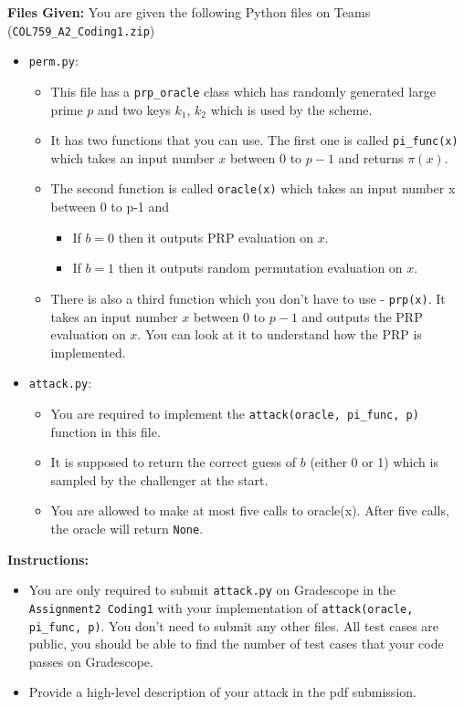\documentclass[11pt]{article}
\begin{document}
\begin{enumerate}
        \textbf{Files Given:} You are given the following Python files on Teams (\texttt{COL759\_A2\_Coding1.zip})
        \begin{itemize}
            \item \texttt{perm.py}:
                \begin{itemize}
                    \item This file has a \texttt{prp\_oracle} class which has randomly generated large prime $p$ and two keys $k_1$, $k_2$ which is used by the scheme.
                    \item It has two functions that you can use. The first one is called \texttt{pi\_func(x)} which takes an input number $x$ between $0$ to $p-1$ and returns $\pi(x)$.
                    \item The second function is called \texttt{oracle(x)} which takes an input number x between 0 to p-1 and 
                    \begin{itemize}
                        \item If $b=0$ then it outputs PRP evaluation on $x$.
                        \item If $b=1$ then it outputs random permutation evaluation on $x$.
                    \end{itemize}
                    \item There is also a third function which you don’t have to use - \texttt{prp(x)}. It takes an input number $x$ between $0$ to $p-1$ and outputs the PRP evaluation on $x$. You can look at it to understand how the PRP is implemented.
                \end{itemize}
            \item \texttt{attack.py}:
                \begin{itemize}
                    \item You are required to implement the \texttt{attack(oracle, pi\_func, p)} function in this file.
                    \item It is supposed to return the correct guess of $b$ (either 0 or 1) which is sampled by the challenger at the start.
                    \item You are allowed to make at most five calls to oracle(x). After five calls, the oracle will return \texttt{None}.                      
                \end{itemize}
        \end{itemize}
        
        \textbf{Instructions:}
        \begin{itemize}
            \item You are only required to submit \texttt{attack.py} on Gradescope in the \texttt{Assignment2 Coding1} with your implementation of \texttt{attack(oracle, pi\_func, p)}. You don’t need to submit any other files. All test cases are public, you should be able to find the number of test cases that your code passes on Gradescope.
            \item Provide a high-level description of your attack in the pdf submission.
        \end{itemize}


\end{enumerate}
\end{document}
